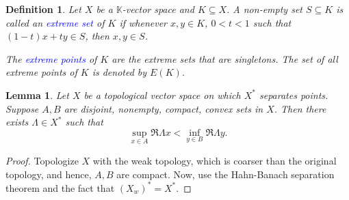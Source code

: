 \documentclass[12pt]{article}
\theoremstyle{thmstyle}
\newtheorem{lemma}[theorem]{Lemma}
\theoremstyle{defstyle}
\newtheorem{definition}[theorem]{Definition}
\newcommand{\R}{\mathbb{R}}
\newcommand{\bbC}{\mathbb{C}}
\newcommand{\K}{\mathbb{K}} %
\newcommand{\define}[1]{\textcolor{blue}{\textit{#1}}}
\begin{document}
\begin{definition}
    Let $X$ be a $\K$-vector space and $K\subseteq X$. A non-empty set $S\subseteq K$ is called an \define{extreme set} of $K$ if whenever $x,y\in K$, $0 < t < 1$ such that $(1 - t)x + ty\in S$, then $x,y\in S$.

    The \define{extreme points} of $K$ are the extreme sets that are singletons. The set of all extreme points of $K$ is denoted by $E(K)$.
\end{definition}

\begin{lemma}
    Let $X$ be a topological vector space on which $X^\ast$ separates points. Suppose $A, B$ are disjoint, nonempty, compact, convex sets in $X$. Then there exists $\Lambda\in X^\ast$ such that 
    \begin{equation*}
        \sup_{x\in A}\Re\Lambda x < \inf_{y\in B}\Re\Lambda y.
    \end{equation*}
\end{lemma}
\begin{proof}
    Topologize $X$ with the weak topology, which is coarser than the original topology, and hence, $A, B$ are compact. Now, use the Hahn-Banach separation theorem and the fact that $(X_w)^\ast = X^\ast$.
\end{proof}
\end{document}

